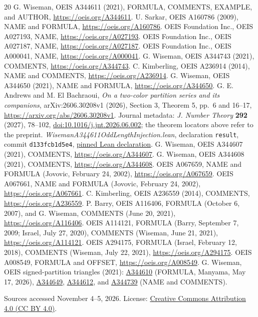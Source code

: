 \documentclass[11pt]{article}
\begin{document}
\begin{thebibliography}{20}
\footnotesize
\setlength{\itemsep}{0pt}
 G. Wiseman, OEIS A344611 (2021),
FORMULA, COMMENTS, EXAMPLE, and AUTHOR,
\url{https://oeis.org/A344611}.
 U. Sarkar, OEIS A160786 (2009), NAME and FORMULA,
\url{https://oeis.org/A160786}.
 OEIS Foundation Inc., OEIS A027193, NAME,
\url{https://oeis.org/A027193}.
 OEIS Foundation Inc., OEIS A027187, NAME,
\url{https://oeis.org/A027187}.
 OEIS Foundation Inc., OEIS A000041, NAME,
\url{https://oeis.org/A000041}.
 G. Wiseman, OEIS A344743 (2021), COMMENTS,
\url{https://oeis.org/A344743}.
 C. Kimberling, OEIS A236914 (2014), NAME and COMMENTS,
\url{https://oeis.org/A236914}.
 G. Wiseman, OEIS A344650 (2021), NAME and FORMULA,
\url{https://oeis.org/A344650}.
 G. E. Andrews and M. El Bachraoui,
\emph{On a two-color partition series and its companions},
arXiv:2606.30208v1 (2026), Section 3, Theorem 5, pp.~6 and 16--17,
\url{https://arxiv.org/abs/2606.30208v1}.
Journal metadata: \emph{J. Number Theory} \textbf{292} (2027), 78--102,
\href{https://doi.org/10.1016/j.jnt.2026.06.002}{doi:10.1016/j.jnt.2026.06.002};
the theorem locators above refer to the preprint.
 \emph{WisemanA344611OddLengthInjection.lean},
declaration \texttt{result}, commit \texttt{d133fcb1d5e4},
\href{https://github.com/the-omega-institute/trureturing/blob/d133fcb1d5e4878bdf5232fd0c07ef2abb3da1d9/D5/S1/Words/Compositions/WisemanA344611OddLengthInjection.lean}{pinned Lean declaration}.
 G. Wiseman, OEIS A344607 (2021), COMMENTS,
\url{https://oeis.org/A344607}.
 G. Wiseman, OEIS A344608 (2021), COMMENTS,
\url{https://oeis.org/A344608}.
 OEIS A067659, NAME and FORMULA (Jovovic, February 24, 2002),
\url{https://oeis.org/A067659}.
 OEIS A067661, NAME and FORMULA (Jovovic, February 24, 2002),
\url{https://oeis.org/A067661}.
 C. Kimberling, OEIS A236559 (2014), COMMENTS,
\url{https://oeis.org/A236559}.
 P. Barry, OEIS A116406, FORMULA (October 6, 2007),
and G. Wiseman, COMMENTS (June 20, 2021), \url{https://oeis.org/A116406}.
 OEIS A114121, FORMULA (Barry, September 7, 2009;
Israel, July 27, 2020),
COMMENTS (Wiseman, June 21, 2021), \url{https://oeis.org/A114121}.
 OEIS A294175, FORMULA (Israel, February 12, 2018),
COMMENTS (Wiseman, July 22, 2021), \url{https://oeis.org/A294175}.
 OEIS A008549, FORMULA and OFFSET,
\url{https://oeis.org/A008549}.
 G. Wiseman, OEIS signed-partition triangles (2021):
\href{https://oeis.org/A344610}{A344610} (FORMULA, Manyama, May 17, 2026),
\href{https://oeis.org/A344649}{A344649},
\href{https://oeis.org/A344612}{A344612}, and
\href{https://oeis.org/A344739}{A344739} (NAME and COMMENTS).
\end{thebibliography}
\noindent\footnotesize Sources accessed November 4--5, 2026. License:
\href{https://creativecommons.org/licenses/by/4.0/}{Creative Commons Attribution 4.0 (CC BY 4.0)}.
\end{document}
